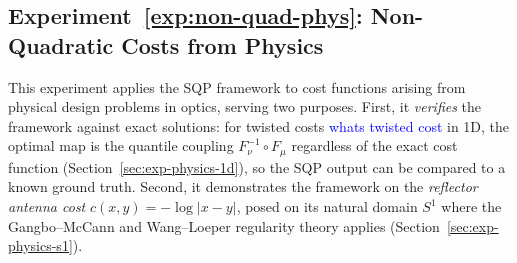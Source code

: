 \documentclass[12pt,leqno]{amsart}
\newcounter{experiment}
\newcommand{\zihe}[1]{\textcolor{blue}{#1}}
\begin{document}






\label{exp:non-quad-phys}
\subsection*{Experiment~\ref{exp:non-quad-phys}: Non-Quadratic Costs from Physics}\label{sec:exp-physics}
This experiment applies the SQP framework to cost functions arising from physical design problems in optics, serving two purposes.  First, it \emph{verifies} the framework against exact solutions: for twisted costs \zihe{whats twisted cost} in 1D, the optimal map is the quantile coupling $F_\nu^{-1} \circ F_\mu$ regardless of the exact cost function (Section~\ref{sec:exp-physics-1d}), so the SQP output can be compared to a known ground truth.  Second, it demonstrates the framework on the \emph{reflector antenna cost} $c(x,y) = -\log|x-y|$, posed on its natural domain $S^1$ where the Gangbo--McCann and Wang--Loeper regularity theory applies (Section~\ref{sec:exp-physics-s1}).
\end{document}
